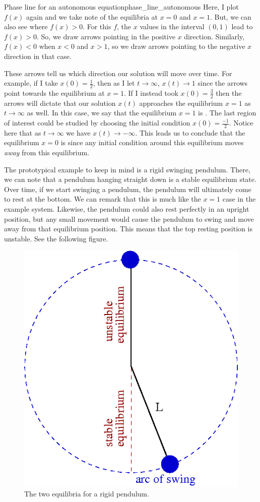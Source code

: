 \begin{ex}{Phase line for an autonomous equation}{phase_line_autonomous}
                Here, I plot $f(x)$ again and we take note of the equilibria at $x=0$ and $x=1$. But, we can also see where $f(x)>0$. For this $f$, the $x$ values in the interval $(0,1)$ lead to $f(x)>0$.  So, we draw arrows pointing in the positive $x$ direction. Similarly, $f(x)<0$ when $x<0$ and $x>1$, so we draw arrows pointing to the negative $x$ direction in that case.
                
                These arrows tell us which direction our solution will move over time.  For example, if I take $x(0)=\frac{1}{2}$, then as I let $t\to \infty$, $x(t)\to 1$ since the arrows point towards the equilibrium at $x=1$.  If I instead took $x(0)=\frac{3}{2}$ then the arrows will dictate that our solution $x(t)$ approaches the equilibrium $x=1$ as $t\to\infty$ as well.  In this case, we say that the equilibrium $x=1$ is .  The last region of interest could be studied by choosing the initial condition $x(0)=\frac{-1}{2}$.  Notice here that as $t\to \infty$ we have $x(t)\to -\infty$.  This leads us to conclude that the equilibrium $x=0$ is  since any initial condition around this equilibrium moves \emph{away} from this equilibrium.  
                \end{ex}
                
                The prototypical example to keep in mind is a rigid swinging pendulum.  There, we can note that a pendulum hanging straight down is a stable equilibrium state. Over time, if we start swinging a pendulum, the pendulum will ultimately come to rest at the bottom.  We can remark that this is much like the $x=1$ case in the example system.  Likewise, the pendulum could also rest perfectly in an upright position, but any small movement would cause the pendulum to swing and move away from that equilibrium position.  This means that the top resting position is unstable. See the following figure.
                
                \begin{figure}[H]
                    \centering
                    \includegraphics[width=.5\textwidth]{Figures_Part_1/pendulum.png}
                    \caption{The two equilibria for a rigid pendulum.}
                \end{figure}
                
